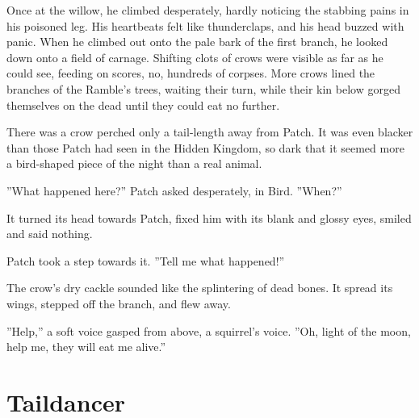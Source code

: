 \documentclass[12pt]{book}
\begin{document}
 Once at the willow, he climbed desperately, hardly noticing the stabbing pains in his poisoned leg. His heartbeats felt like thunderclaps, and his head buzzed with panic. When he climbed out onto the pale bark of the first branch, he looked down onto a field of carnage. Shifting clots of crows were visible as far as he could see, feeding on scores, no, hundreds of corpses. More crows lined the branches of the Ramble's trees, waiting their turn, while their kin below gorged themselves on the dead until they could eat no further.\par
 There was a crow perched only a tail-length away from Patch. It was even blacker than those Patch had seen in the Hidden Kingdom, so dark that it seemed more a bird-shaped piece of the night than a real animal.\par
 ''What happened here?'' Patch asked desperately, in Bird. ''When?''\par
 It turned its head towards Patch, fixed him with its blank and glossy eyes, smiled and said nothing.\par
 Patch took a step towards it. ''Tell me what happened!''\par
 The crow's dry cackle sounded like the splintering of dead bones. It spread its wings, stepped off the branch, and flew away.\par
 ''Help,'' a soft voice gasped from above, a squirrel's voice. ''Oh, light of the moon, help me, they will eat me alive.''\par

\section{Taildancer}
\end{document}
